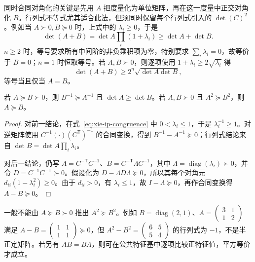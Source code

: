 同时合同对角化的关键是先用 $A$ 把度量化为单位矩阵，再在这一度量中正交对角化 $B$。行列式不等式尤其适合此法，但须同时保留每个行列式引入的 $\det(C)^2$。例如当 $A\succ0,B\succeq0$ 时，上式中的 $\lambda_i\geq0$，于是
\[
\det(A+B)=\det A\prod_i(1+\lambda_i)
\geq\det A+\det B.
\]
$n\geq2$ 时，等号要求所有中间阶的非负乘积项为零，特别要求 $\sum_i\lambda_i=0$，故等价于 $B=0$；$n=1$ 时恒取等号。若 $A,B\succ0$，则逐项使用 $1+\lambda_i\geq2\sqrt{\lambda_i}$ 得
\begin{equation}
\label{eq:xie-ip-determinant-amgm}
\det(A+B)\geq2^n\sqrt{\det A\det B},
\end{equation}
等号当且仅当 $A=B$。

\begin{proposition}
若 $A\succeq B\succ0$，则 $B^{-1}\succeq A^{-1}$ 且 $\det A\geq\det B$。若 $A,B\succ0$ 且 $A^2\succeq B^2$，则 $A\succeq B$。
\end{proposition}
\begin{proof}
对前一结论，在式~\eqref{eq:xie-ip-congruence} 中 $0<\lambda_i\leq1$，于是 $\lambda_i^{-1}\geq1$。对逆矩阵使用 $C^{-1}(\cdot)(C^{\mathsf T})^{-1}$ 的合同变换，得到 $B^{-1}-A^{-1}\succeq0$；行列式结论来自 $\det B=\det A\prod_i\lambda_i$。

对后一结论，仍写 $A=C^{-\mathsf T}C^{-1}$、$B=C^{-\mathsf T}\Lambda C^{-1}$，其中 $\Lambda=\operatorname{diag}(\lambda_i)\succ0$，并令 $D=C^{-1}C^{-\mathsf T}\succ0$。假设化为 $D-\Lambda D\Lambda\succeq0$，所以其每个对角元 $d_{ii}(1-\lambda_i^2)\geq0$。由于 $d_{ii}>0$，有 $\lambda_i\leq1$，故 $I-\Lambda\succeq0$，再作合同变换得 $A-B\succeq0$。
\end{proof}

\begin{notealert}[type=caution,title={矩阵序不能任意平方}]
一般不能由 $A\succeq B\succ0$ 推出 $A^2\succeq B^2$。例如 $B=\operatorname{diag}(2,1)$、$A=\begin{pmatrix}3&1\\1&2\end{pmatrix}$ 满足 $A-B=\begin{pmatrix}1&1\\1&1\end{pmatrix}\succeq0$，但 $A^2-B^2=\begin{pmatrix}6&5\\5&4\end{pmatrix}$ 的行列式为 $-1$，不是半正定矩阵。若另有 $AB=BA$，则可在公共特征基中逐项比较正特征值，平方等价才成立。
\end{notealert}

